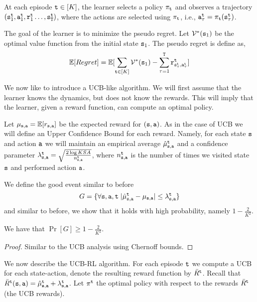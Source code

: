 At each episode ${\tt t}\in[K]$, the learner selects a policy $\pi_{\tt t}$ and observes a trajectory $({\tt s}^{\tt t}_1, {\tt a}^{\tt t}_1,{\tt r}^{\tt t}_1 \ldots , {\tt s}_{\tt T}^{\tt t})$, where the actions are selected using $\pi_{\tt t}$, i.e., ${\tt a}_\tau^{\tt t}=\pi_{\tt t}({\tt s}_\tau^{\tt t})$.

The goal of the learner is to minimize the pseudo regret. Let $\mathcal{V}^*({\tt s}_1)$ be the optimal value function from the initial state ${\tt s}_1$. The pseudo regret is define as,
\[
\mathbb{E}[Regret] = \mathbb{E}[\sum_{{\tt t}\in[K]}\mathcal{V}^*({\tt s}_1)-\sum_{\tau=1}^{\tt T} {\tt r}^{\tt t}_{{\tt s}_\tau^{\tt t},{\tt a}_\tau^{\tt t}}]
\]

We now like to introduce a UCB-like algorithm. We will first assume that the learner knows the dynamics, but does not know the rewards. This will imply that the learner, given a reward function, can compute an optimal policy.

Let $\mu_{{\tt s},{\tt a}}=\mathbb{E}[r_{{\tt s},{\tt a}}]$ be the expected reward for $({\tt s},{\tt a})$.
%
As in the case of UCB we will define an Upper Confidence Bound for each reward. Namely, for each state ${\tt s}$ and action ${\tt a}$ we will maintain an empirical average $\hat{\mu}^{\tt t}_{{\tt s},{\tt a}}$ and a confidence parameter $\lambda^{\tt t}_{{\tt s},{\tt a}}=\sqrt{\frac{2\log KSA}{n_{{\tt s},{\tt a}}^{\tt t}}}$, where $n_{{\tt s},{\tt a}}^{\tt t}$ is the number of times we visited state ${\tt s}$ and performed action ${\tt a}$.

We define the good event similar to before
\[
G=\{\forall{\tt s},{\tt a}, {\tt t}\; |\hat{\mu}^{\tt t}_{{\tt s},{\tt a}}-\mu_{{\tt s},{\tt a}}|\leq \lambda_{{\tt s},{\tt a}}^{\tt t}\}
\]
and similar to before, we show that it holds with high probability, namely $1-\frac{2}{K^2}$.

\begin{lemma}
    We have that  $\Pr[G]\geq 1-\frac{2}{K^2}$.
\end{lemma}

\begin{proof}
    Similar to the UCB analysis using Chernoff bounds.
\end{proof}

We now describe the UCB-RL algorithm. For each episode ${\tt t}$ we compute a UCB for each state-action, denote the resulting reward function by $\bar{R}^{\tt t}$. Recall that $\bar{R}^{\tt t}({\tt s},{\tt a})=\hat{\mu}_{{\tt s},{\tt a}}^{\tt t}+\lambda_{{\tt s},{\tt a}}^{\tt t}$.  Let $\pi^{\tt t}$ the optimal policy with respect to the rewards $\bar{R}^{\tt t}$ (the UCB rewards).

